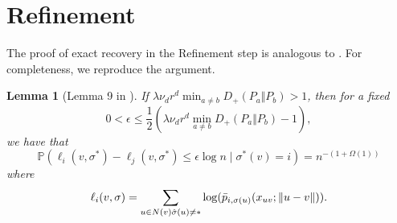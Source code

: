 \documentclass[11pt, a4paper]{amsart}
\newtheorem{lemma}[theorem]{Lemma}
\renewcommand{\P}{\mathbb{P}}
\newcommand{\1}{\mathbf{1}}
\theoremstyle{definition}
\theoremstyle{remark}
\theoremstyle{definition}
\begin{document}
\section{Refinement}

The proof of exact recovery in the Refinement step is analogous to \cite[Section C.3]{gaudio2026jan}. For completeness, we reproduce the argument. 

\begin{lemma}[Lemma 9 in \cite{gaudio2026jan}]
\label{lem:correct_labels_MAP_failures}
    If $\lambda \nu_d r^d \min_{a \neq b} D_+(P_a \Vert P_b) > 1$, then for a fixed 
    \[0 < \epsilon \leq \frac 12(\lambda \nu_d r^d \min_{a \neq b} D_+(P_a \Vert P_b) - 1 ),\]
    we have that
    \begin{equation*}
        \P(\ell_i(v, \sigma^*) - \ell_j(v, \sigma^*) \leq \epsilon \log n \mid \sigma^*(v) = i) = n^{-(1 + \Omega(1))}
    \end{equation*}
    where
    \begin{equation*}
        \ell_i(v, \sigma) = \sum_{\substack{u \in N(v)}\\{\hat \sigma(u) \neq *}} \log(\bar{p}_{i, \sigma(u)}(x_{uv};\|u - v\|)).
    \end{equation*}
\end{lemma}
\end{document}

